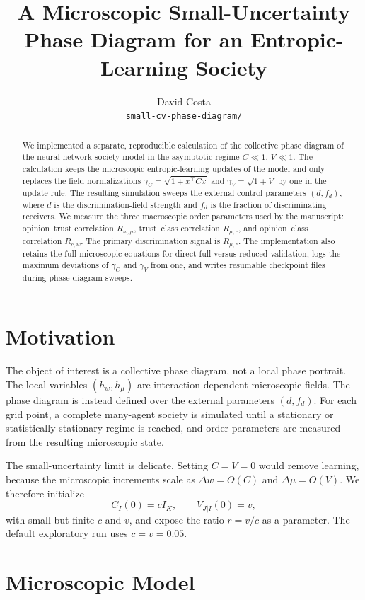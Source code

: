 \documentclass{article}
\title{A Microscopic Small-Uncertainty Phase Diagram for an Entropic-Learning Society}
\author{David Costa \\
\texttt{small-cv-phase-diagram/}}
\newcommand{\Rwm}{R_{w,\mu}}
\newcommand{\Rmc}{R_{\mu,c}}
\newcommand{\Rcw}{R_{c,w}}
\newcommand{\hmu}{h_\mu}
\newcommand{\hw}{h_w}
\begin{document}
\maketitle

\begin{abstract}
We implemented a separate, reproducible calculation of the collective
phase diagram of the neural-network society model in the asymptotic regime
$C\ll 1$, $V\ll 1$.  The calculation keeps the microscopic entropic-learning
updates of the model and only replaces the field normalizations
$\gamma_C=\sqrt{1+x^\top Cx}$ and $\gamma_V=\sqrt{1+V}$ by one in the update
rule.  The resulting simulation sweeps the external control parameters
$(d,f_d)$, where $d$ is the discrimination-field strength and $f_d$ is the
fraction of discriminating receivers.  We measure the three macroscopic order
parameters used by the manuscript: opinion--trust correlation $\Rwm$,
trust--class correlation $\Rmc$, and opinion--class correlation $\Rcw$.
The primary discrimination signal is $\Rmc$.  The implementation also retains
the full microscopic equations for direct full-versus-reduced validation, logs
the maximum deviations of $\gamma_C$ and $\gamma_V$ from one, and writes
resumable checkpoint files during phase-diagram sweeps.
\end{abstract}

\section{Motivation}

The object of interest is a collective phase diagram, not a local phase portrait.
The local variables $(\hw,\hmu)$ are interaction-dependent microscopic fields.
The phase diagram is instead defined over the external parameters $(d,f_d)$.
For each grid point, a complete many-agent society is simulated until a
stationary or statistically stationary regime is reached, and order parameters
are measured from the resulting microscopic state.

The small-uncertainty limit is delicate.  Setting $C=V=0$ would remove learning,
because the microscopic increments scale as $\Delta w=O(C)$ and
$\Delta\mu=O(V)$.  We therefore initialize
\[
  C_I(0)=cI_K,\qquad V_{J|I}(0)=v,
\]
with small but finite $c$ and $v$, and expose the ratio $r=v/c$ as a parameter.
The default exploratory run uses $c=v=0.05$.

\section{Microscopic Model}
\end{document}
